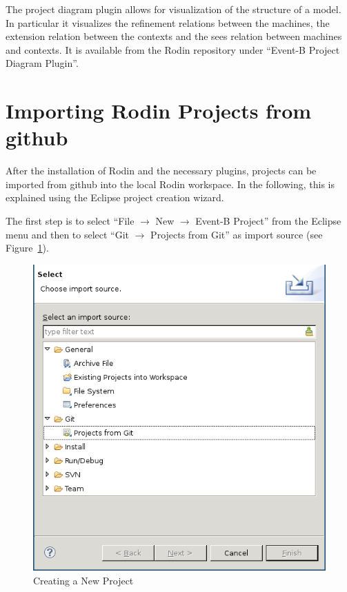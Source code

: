 \documentclass[10pt,a4paper]{article}
\newcommand{\skalierung}{.6}
\begin{document}
The project diagram plugin allows for visualization of the structure of a
model. In particular it visualizes the refinement relations between the
machines, the extension relation between the contexts and the sees relation
between machines and contexts. It is available from the Rodin repository under
``Event-B Project Diagram Plugin''.

\section{Importing Rodin Projects from github}
\label{sec:import-rodin-proj}

After the installation of Rodin and the necessary plugins, projects can be
imported from github into the local Rodin workspace. In the following, this is
explained using the Eclipse project creation wizard.

The first step is to select ``File $\rightarrow$ New $\rightarrow$ Event-B
Project'' from the Eclipse menu and then to select ``Git $\rightarrow$ Projects
from Git'' as import source (see Figure~\ref{fig:create-new-project}).

\begin{figure}[H]
  \centering
  \includegraphics[width=\skalierung\textwidth]{project_import_step1}
  \caption{Creating a New Project}
  \label{fig:create-new-project}
\end{figure}
\end{document}
